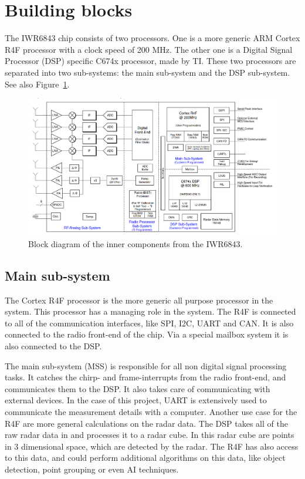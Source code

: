 \section{Building blocks}
\label{sec:building_blocks}
The IWR6843 chip consists of two processors. One is a more generic ARM Cortex R4F processor with a clock speed of 200 MHz. The other one is a Digital Signal Processor (DSP) specific C674x processor, made by TI. These two processors are separated into two sub-systems: the main sub-system and the DSP sub-system. See also Figure~\ref{fig:iwr6843_inner_block_diagram}.

\begin{figure}[t]
\centering
\includegraphics[width=.95\textwidth]{figures/realtime_implementation/iwr6843_inner.png}
\caption{Block diagram of the inner components from the IWR6843.}
\label{fig:iwr6843_inner_block_diagram}
\end{figure}

\subsection{Main sub-system}
The Cortex R4F processor is the more generic all purpose processor in the system. This processor has a managing role in the system. The R4F is connected to all of the communication interfaces, like SPI, I2C, UART and CAN. It is also connected to the radio front-end of the chip. Via a special mailbox system it is also connected to the DSP. 

The main sub-system (MSS) is responsible for all non digital signal processing tasks. It catches the chirp- and frame-interrupts from the radio front-end, and communicates them to the DSP. It also takes care of communicating with external devices. In the case of this project, UART is extensively used to communicate the measurement details with a computer. Another use case for the R4F are more general calculations on the radar data. The DSP takes all of the raw radar data in and processes it to a radar cube. In this radar cube are points in 3 dimensional space, which are detected by the radar. The R4F has also access to this data, and could perform additional algorithms on this data, like object detection, point grouping or even AI techniques.

